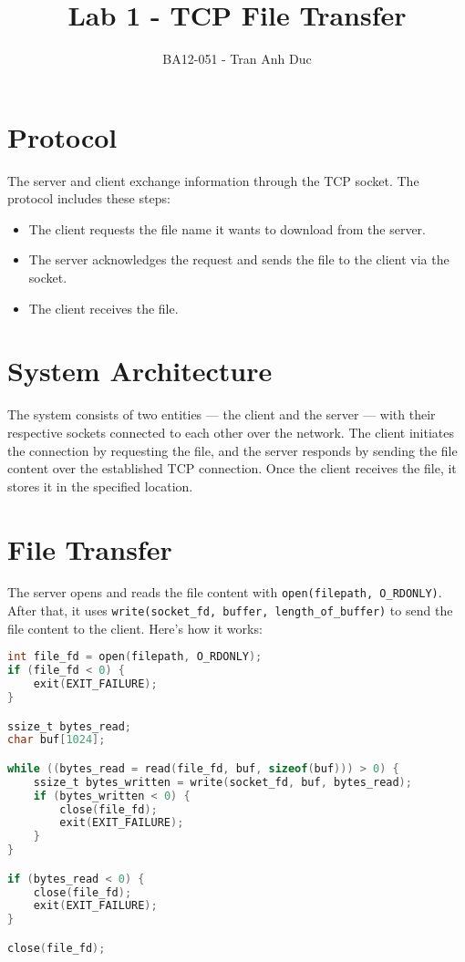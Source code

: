 \documentclass[a4paper,12pt]{article}
\title{Lab 1 - TCP File Transfer}
\author{BA12-051 - Tran Anh Duc}
\begin{document}
\maketitle

\section{Protocol}
The server and client exchange information through the TCP socket. The protocol includes these steps:
\begin{itemize}
    \item The client requests the file name it wants to download from the server.
    \item The server acknowledges the request and sends the file to the client via the socket.
    \item The client receives the file.
\end{itemize}

\section{System Architecture}
The system consists of two entities — the client and the server — with their respective sockets connected to each other over the network. The client initiates the connection by requesting the file, and the server responds by sending the file content over the established TCP connection. Once the client receives the file, it stores it in the specified location.

\section{File Transfer}
The server opens and reads the file content with \texttt{open(filepath, O\_RDONLY)}. After that, it uses \texttt{write(socket\_fd, buffer, length\_of\_buffer)} to send the file content to the client. Here's how it works:

\begin{lstlisting}[language=C]
int file_fd = open(filepath, O_RDONLY);
if (file_fd < 0) {
    exit(EXIT_FAILURE);
}

ssize_t bytes_read;
char buf[1024];

while ((bytes_read = read(file_fd, buf, sizeof(buf))) > 0) {
    ssize_t bytes_written = write(socket_fd, buf, bytes_read);
    if (bytes_written < 0) {
        close(file_fd);
        exit(EXIT_FAILURE);
    }
}

if (bytes_read < 0) {
    close(file_fd);
    exit(EXIT_FAILURE);
}

close(file_fd);
\end{lstlisting}
\end{document}

